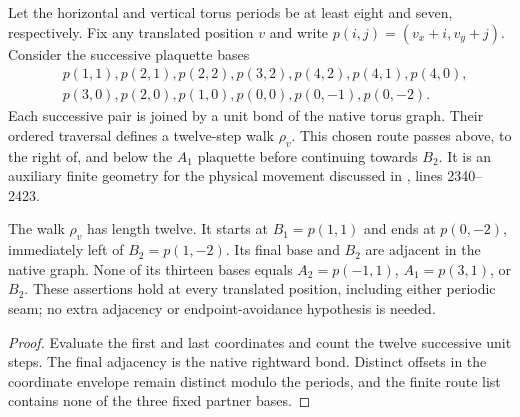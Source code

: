 \begin{definition}
    \label{def:peps_torus_swept_physical_endpoint_route}
    \leanok
    Let the horizontal and vertical torus periods be at least eight and seven,
    respectively. Fix any translated position $v$ and write
    $p(i,j)=(v_x+i,v_y+j)$. Consider the successive plaquette bases
    \begin{align}
         & p(1,1),p(2,1),p(2,2),p(3,2),p(4,2),p(4,1),p(4,0), \\
         & p(3,0),p(2,0),p(1,0),p(0,0),p(0,-1),p(0,-2).
    \end{align}
    Each successive pair is joined by a unit bond of the native
    torus graph. Their ordered traversal defines a twelve-step walk $\rho_v$.
    This chosen route passes above, to the right of, and below the $A_1$
    plaquette before continuing towards $B_2$.
    It is an auxiliary finite geometry for the physical movement discussed in
    \cite[fluxon-braiding passage]{Schuch2010PEPS}, lines 2340--2423.
\end{definition}

\begin{lemma}
    \label{thm:peps_torus_swept_physical_endpoint_route}
    \leanok
    The walk $\rho_v$ has length twelve. It starts at
    $B_1=p(1,1)$ and ends at $p(0,-2)$, immediately left of
    $B_2=p(1,-2)$. Its final base and $B_2$ are adjacent in the native graph.
    None of its thirteen bases equals $A_2=p(-1,1)$, $A_1=p(3,1)$, or $B_2$.
    These assertions hold at every translated position, including either
    periodic seam; no extra adjacency or endpoint-avoidance hypothesis is needed.
\end{lemma}
\begin{proof}\leanok
    Evaluate the first and last coordinates and count the twelve successive
    unit steps. The final adjacency is the native rightward bond. Distinct
    offsets in the coordinate envelope remain distinct modulo the periods,
    and the finite route list contains none of the three fixed partner bases.
\end{proof}

